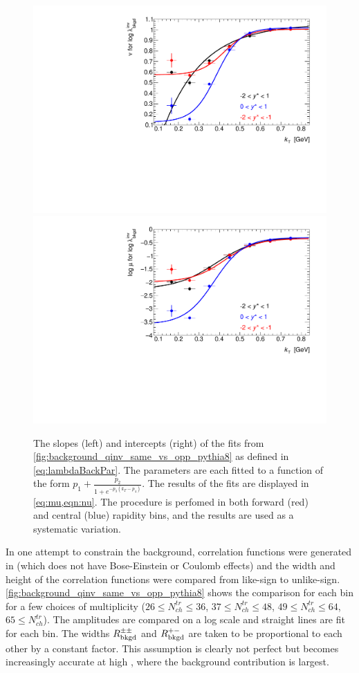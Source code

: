 \begin{figure}[t]
\begin{minipage}[t]{1.0\textwidth}
\centering
\includegraphics[width=.49\linewidth]{can_kt_qinv_backLambda_slope_combined.pdf}
\includegraphics[width=.49\linewidth]{can_kt_qinv_backLambda_intercept_combined.pdf}
\end{minipage}
\caption{The slopes (left) and intercepts (right) of the fits from \cref{fig:background_qinv_same_vs_opp_pythia8} as defined in \cref{eq:lambdaBackPar}. The parameters are each fitted to a function of the form $p_1 + \frac{p_2}{1 + e^{-p_3(k_T - p_4)}}$. The results of the fits are displayed in \cref{eq:mu,eqn:nu}. The procedure is perfomed in both forward (red) and central (blue) rapidity bins, and the results are used as a systematic variation.}
\label{fig:background_qinv_same_vs_opp_pythia8_fits}
\end{figure}

In one attempt to constrain the background, correlation functions were generated in  (which does not have Bose-Einstein or Coulomb effects) and the width and height of the correlation functions were compared from like-sign to unlike-sign.
\cref{fig:background_qinv_same_vs_opp_pythia8} shows the comparison for each \kt bin for a few choices of multiplicity ($26 \leq N_{ch}^{tr} \leq36$, $37 \leq N_{ch}^{tr} \leq48$, $49 \leq N_{ch}^{tr} \leq64$, $65 \leq N_{ch}^{tr}$).
The amplitudes are compared on a log scale and straight lines are fit for each \kt bin.
The widths $R_{\mathrm{bkgd}}^{\pm\pm}$ and $R_{\mathrm{bkgd}}^{+-}$ are taken to be proportional to each other by a constant factor.
This assumption is clearly not perfect but becomes increasingly accurate at high \kt, where the background contribution is largest.

